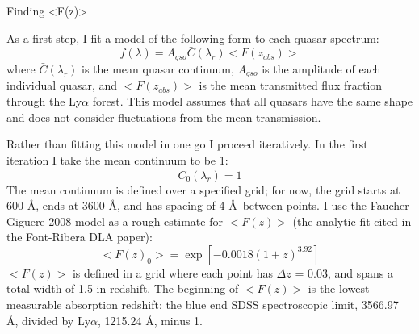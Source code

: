 \documentclass[12pt]{aastex}
\begin{document}
\begin{section}{Finding <F(z)>}

As a first step, I fit a model of the following form to each quasar spectrum:
\begin{equation}
f(\lambda) = A_{qso} \bar{C}(\lambda_{r}) <F(z_{abs})>
\label{eqn:model}
\end{equation}
where $\bar{C}(\lambda_{r})$ is the mean quasar continuum, $A_{qso}$ is the amplitude of each individual quasar, and $<F(z_{abs})>$ is the
mean transmitted flux fraction through the Ly$\alpha$ forest.  This model assumes that all quasars have the same shape and does not consider
fluctuations from the mean transmission.

Rather than fitting this model in one go I proceed iteratively.  In the first iteration I take the mean continuum to be 1:
\begin{equation}
\bar{C}_0(\lambda_{r}) = 1
\label{eqn:c0}
\end{equation}
The mean continuum is defined over a specified grid; for now, the grid starts at 600 \AA, ends at 3600 \AA, and has spacing of 4 \AA\ between points.
I use the Faucher-Giguere 2008 model as a rough estimate for $<F(z)>$ (the analytic fit cited in the Font-Ribera DLA paper):
\begin{equation}
<F(z)_0> = \exp{[-0.0018(1+z)^{3.92}]}
\label{eqn:fz0}
\end{equation}
$<F(z)>$ is defined in a grid where each point has $\Delta z$ = 0.03, and spans a total width of 1.5 in redshift.  The beginning of $<F(z)>$ is the
lowest measurable absorption redshift: the blue end SDSS spectroscopic limit, 3566.97 \AA, divided by Ly$\alpha$, 1215.24 \AA, minus 1.


\end{section}
\end{document}

